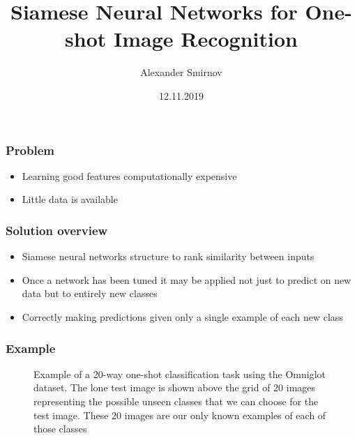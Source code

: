 \documentclass[xetex,mathserif,serif]{beamer}
\title{Siamese Neural Networks for One-shot Image Recognition}
\author{Alexander Smirnov}
\date{12.11.2019}
\begin{document}
	\frame{\titlepage}

	\begin{frame}
		\frametitle{Problem}
			\begin{itemize}
		 		\item Learning good features computationally expensive
		 		\item Little data is available
			\end{itemize}
	\end{frame}
	
	\begin{frame}
		\frametitle{Solution overview}
			\begin{itemize}
		 		\item Siamese neural networks structure to rank similarity between inputs
		 		\item Once a network has been tuned it may be applied not just to predict on new data but to entirely new classes
                \item Correctly making predictions given only a single example of each new class
			\end{itemize}
	\end{frame}
	
	\begin{frame}
		\frametitle{Example}
    		\begin{figure}[h]
                \caption{Example of a 20-way one-shot classification task using the Omniglot dataset. The lone test image is shown above the grid of 20 images representing the possible unseen classes that we can choose for the test image. These 20 images are our only known examples of each of those classes}
                \label{fig:image}
            \end{figure}
	\end{frame}			
	
\end{document}

